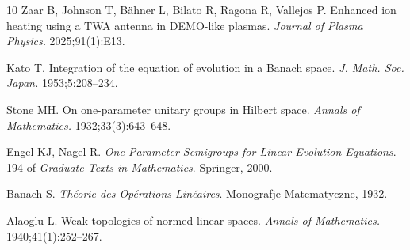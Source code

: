 \documentclass[AMA,Times2COL]{WileyNJDv5}
\begin{document}
\begin{thebibliography}{10}
Zaar B, Johnson T, B{\"a}hner L, Bilato R, Ragona R, Vallejos P. Enhanced ion
  heating using a TWA antenna in DEMO-like plasmas. {\it Journal of Plasma
  Physics.} 2025\string;91(1)\string:E13.

Kato T. Integration of the equation of evolution in a Banach space. {\it J.
  Math. Soc. Japan.} 1953\string;5\string:208--234.

Stone MH. On one-parameter unitary groups in {H}ilbert space. {\it Annals of
  Mathematics.} 1932\string;33(3)\string:643--648.

Engel KJ, Nagel R. {\it One-Parameter Semigroups for Linear Evolution
  Equations}. 194 of {\it Graduate Texts in Mathematics}.
\newblock Springer, 2000.

Banach S. {\it Th{\'e}orie des Op{\'e}rations Lin{\'e}aires}.
\newblock Monografje Matematyczne, 1932.

Alaoglu L. Weak topologies of normed linear spaces. {\it Annals of
  Mathematics.} 1940\string;41(1)\string:252--267.

\end{thebibliography}











\end{document}
